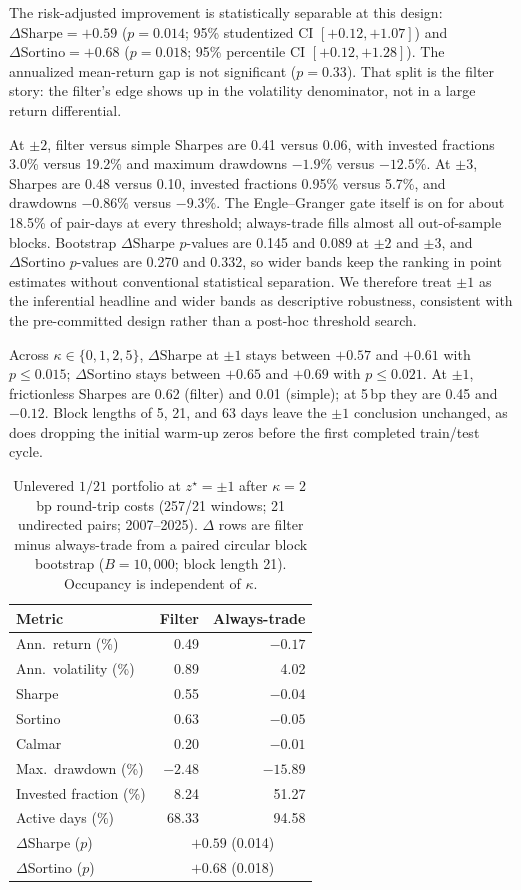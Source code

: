 \documentclass[11pt,a4paper]{article}
\begin{document}
The risk-adjusted improvement is statistically separable at this design:
$\Delta\mathrm{Sharpe}=+0.59$ ($p=0.014$; 95\% studentized CI $[+0.12,+1.07]$) and
$\Delta\mathrm{Sortino}=+0.68$ ($p=0.018$; 95\% percentile CI $[+0.12,+1.28]$). The
annualized mean-return gap is not significant ($p=0.33$). That split is the filter story:
the filter's edge shows up in the volatility denominator, not in a large return differential.

At $\pm 2$, filter versus simple Sharpes are 0.41 versus 0.06, with invested fractions
3.0\% versus 19.2\% and maximum drawdowns $-1.9\%$ versus $-12.5\%$. At $\pm 3$, Sharpes are
0.48 versus 0.10, invested fractions 0.95\% versus 5.7\%, and drawdowns $-0.86\%$ versus
$-9.3\%$. The Engle--Granger gate itself is on for about 18.5\% of pair-days at every
threshold; always-trade fills almost all out-of-sample blocks. Bootstrap
$\Delta\mathrm{Sharpe}$ $p$-values are 0.145 and 0.089 at $\pm 2$ and $\pm 3$, and
$\Delta\mathrm{Sortino}$ $p$-values are 0.270 and 0.332, so wider bands keep the ranking in
point estimates without conventional statistical separation. We therefore treat $\pm 1$ as the
inferential headline and wider bands as descriptive robustness, consistent with the
pre-committed design rather than a post-hoc threshold search.

Across $\kappa\in\{0,1,2,5\}$, $\Delta\mathrm{Sharpe}$ at $\pm 1$ stays between $+0.57$ and
$+0.61$ with $p\le 0.015$; $\Delta\mathrm{Sortino}$ stays between $+0.65$ and $+0.69$ with
$p\le 0.021$. At $\pm 1$, frictionless Sharpes are 0.62 (filter) and 0.01 (simple); at
5\,bp they are 0.45 and $-0.12$. Block lengths of 5, 21, and 63 days leave the $\pm 1$
conclusion unchanged, as does dropping the initial warm-up zeros before the first completed
train/test cycle.

\begin{table}[ht]
\centering
\caption{Unlevered $1/21$ portfolio at $z^{\star}=\pm 1$ after $\kappa=2$\,bp round-trip
costs (257/21 windows; 21 undirected pairs; 2007--2025). $\Delta$ rows are filter minus
always-trade from a paired circular block bootstrap ($B=10{,}000$; block length 21).
Occupancy is independent of $\kappa$.}
\label{tbl:main}
\begin{tabular}{lrr}
\toprule
Metric & Filter & Always-trade \\
\midrule
Ann.\ return (\%) & 0.49 & $-0.17$ \\
Ann.\ volatility (\%) & 0.89 & 4.02 \\
Sharpe & 0.55 & $-0.04$ \\
Sortino & 0.63 & $-0.05$ \\
Calmar & 0.20 & $-0.01$ \\
Max.\ drawdown (\%) & $-2.48$ & $-15.89$ \\
Invested fraction (\%) & 8.24 & 51.27 \\
Active days (\%) & 68.33 & 94.58 \\
$\Delta$Sharpe ($p$) & \multicolumn{2}{c}{$+0.59$ (0.014)} \\
$\Delta$Sortino ($p$) & \multicolumn{2}{c}{$+0.68$ (0.018)} \\
\bottomrule
\end{tabular}
\end{table}
\end{document}
